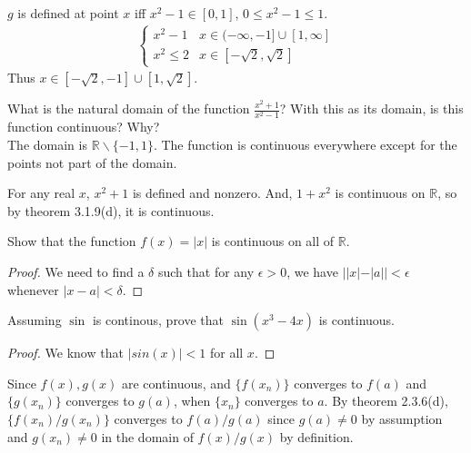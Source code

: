 \documentclass[12pt]{book}
\newcommand{\R}{\mathbb{R}}
\newenvironment{exercise}[2][Exercise]{\begin{trivlist}
\item[\hskip \labelsep {\bfseries #1}\hskip \labelsep {\bfseries #2.}]}{\end{trivlist}}
\begin{document}
\begin{exercise}{1.4.6}
\begin{exercise}{3.1.1}
    $g$ is defined at point $x$ iff $x^2-1 \in [0,1]$, $0 \leq x^2-1 \leq 1$.
    \begin{align*}
        \begin{cases}
            x^2-1 & x\in (-\infty,-1] \cup [1,\infty] \\
            x^2 \leq 2 & x \in [-\sqrt{2},\sqrt{2}]
         \end{cases}
    \end{align*}
    Thus $x \in [-\sqrt{2},-1] \cup [1,\sqrt{2}]$.
\end{exercise}

\begin{exercise}{3.1.2}
What is the natural domain of the function $\frac{x^2 +1}{x^2-1}$? With this as its domain, is this function continuous? Why? \\

The domain is $\R \backslash \{-1,1\}$. The function is continuous everywhere except for the points not part of the domain.
\end{exercise}

\begin{exercise}{3.1.3}
For any real $x$, ${x^2+1}$ is defined and nonzero. And, $1+x^2$ is continuous on $\mathbb{R}$, so by theorem 3.1.9(d), it is continuous.
\end{exercise}

\begin{exercise}{3.1.4}
Show that the function $f(x) = |x|$ is continuous on all of $\R$.

	\begin{proof}
	We need to find a $\delta$ such that for any $\epsilon > 0$, we have $||x| - |a|| < \epsilon$ whenever $|x-a|< \delta$.
	\end{proof}
\end{exercise}

\begin{exercise}{3.1.5}
Assuming $\sin$ is continous, prove that $\sin(x^3-4x)$ is continuous.

	\begin{proof}
	We know that $|sin(x)| < 1$ for all $x$.  
	\end{proof}
\end{exercise}

\begin{exercise}{3.1.6}
Since $f(x), g(x)$ are continuous, and $\{f(x_n)\}$ converges to $f(a)$ and $\{g(x_n)\}$ converges to $g(a)$, when $\{x_n\}$ converges to $a$. By theorem 2.3.6(d), $\{f(x_n)/g(x_n)\}$ converges to $f(a)/g(a)$ since $g(a) \neq 0$ by assumption and $g(x_n) \neq 0$ in the domain of $f(x)/g(x)$ by definition. 
\end{exercise}


\end{exercise}
\end{document}
